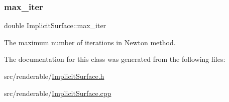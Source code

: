 \mbox{\label{classImplicitSurface_ad92c06925b2496b7fe3a1d2659a87075}} 
\subsubsection{\texorpdfstring{max\_iter}{max\_iter}}
{\footnotesize\ttfamily double Implicit\+Surface\+::max\+\_\+iter\hspace{0.3cm}{\ttfamily [private]}}



The maximum number of iterations in Newton method. 



The documentation for this class was generated from the following files\+:\begin{DoxyCompactItemize}
\item 
src/renderable/\mbox{\hyperlink{ImplicitSurface_8h}{Implicit\+Surface.\+h}}\item 
src/renderable/\mbox{\hyperlink{ImplicitSurface_8cpp}{Implicit\+Surface.\+cpp}}\end{DoxyCompactItemize}
